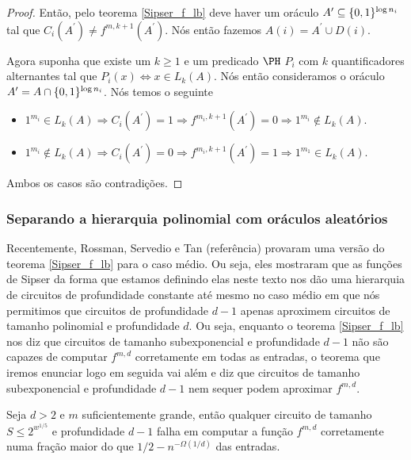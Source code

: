 \begin{proof}
Então, pelo teorema \ref{Sipser_f_lb} deve haver um oráculo $A^{\prime} \subseteq \{0, 1\}^{\log n_{i}}$ tal que $C_{i}(A^{\prime}) \neq f^{m, k + 1}(A^{\prime})$. Nós então fazemos $A(i) = A^{\prime} \cup D(i)$.

Agora suponha que existe um $k \geq 1$ e um predicado $\PH$ $P_{i}$ com $k$ quantificadores alternantes tal que $P_{i}(x) \iff x \in L_{k}(A)$. Nós então consideramos o oráculo $A^{\prime} = A \cap \{0, 1\}^{\log n_{i}}$. Nós temos o seguinte

\begin{itemize}

	\item $1^{m_{i}} \in L_{k}(A) \Rightarrow C_{i}(A^{\prime}) = 1 \Rightarrow f^{m_{i}, k + 1}(A^{\prime}) = 0 \Rightarrow 1^{m_{i}} \not\in L_{k}(A)$.
	
	\item $1^{m_{i}} \not\in L_{k}(A) \Rightarrow C_{i}(A^{\prime}) = 0 \Rightarrow f^{m_{i}, k + 1}(A^{\prime}) = 1 \Rightarrow 1^{m_{1}} \in L_{k}(A)$.

\end{itemize}

Ambos os casos são contradições.

\end{proof}

\subsubsection{Separando a hierarquia polinomial com oráculos aleatórios}

Recentemente, Rossman, Servedio e Tan (referência) provaram uma versão do teorema \ref{Sipser_f_lb} para o caso médio. Ou seja, eles mostraram que as funções de Sipser da forma que estamos definindo elas neste texto nos dão uma hierarquia de circuitos de profundidade constante até mesmo no caso médio em que nós permitimos que circuitos de profundidade $d - 1$ apenas aproximem circuitos de tamanho polinomial e profundidade $d$. Ou seja, enquanto o teorema \ref{Sipser_f_lb} nos diz que circuitos de tamanho subexponencial e profundidade $d - 1$ não são capazes de computar $f^{m, d}$ corretamente em todas as entradas, o teorema que iremos enunciar logo em seguida vai além e diz que circuitos de tamanho subexponencial e profundidade $d -1$ nem sequer podem aproximar $f^{m, d}$.

\begin{teo} \label{Sipser_f_lb_app}

Seja $d > 2$ e $m$ suficientemente grande, então qualquer circuito de tamanho $S \leq 2^{w^{1/5}}$ e profundidade $d - 1$ falha em computar a função $f^{m, d}$ corretamente numa fração maior do que $1/2 - n^{-\Omega(1/d)}$ das entradas.

\end{teo}

